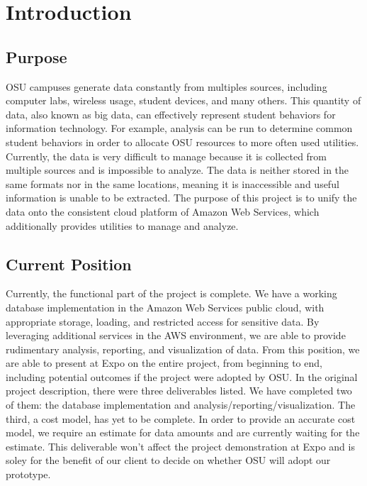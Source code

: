 \section{Introduction}
	\subsection{Purpose}
    OSU campuses generate data constantly from multiples sources, including computer labs, wireless usage, student devices, and many others. This quantity of data, also known as big data, can effectively represent student behaviors for information technology. For example, analysis can be run to determine common student behaviors in order to allocate OSU resources to more often used utilities. Currently, the data is very difficult to manage because it is collected from multiple sources and is impossible to analyze. The data is neither stored in the same formats nor in the same locations, meaning it is inaccessible and useful information is unable to be extracted. The purpose of this project is to unify the data onto the consistent cloud platform of Amazon Web Services, which additionally provides utilities to manage and analyze.
    
    \subsection{Current Position}
    Currently, the functional part of the project is complete. We have a working database implementation in the Amazon Web Services public cloud, with appropriate storage, loading, and restricted access for sensitive data. By leveraging additional services in the AWS environment, we are able to provide rudimentary analysis, reporting, and visualization of data. From this position, we are able to present at Expo on the entire project, from beginning to end, including potential outcomes if the project were adopted by OSU. In the original project description, there were three deliverables listed. We have completed two of them: the database implementation and analysis/reporting/visualization. The third, a cost model, has yet to be complete. In order to provide an accurate cost model, we require an estimate for data amounts and are currently waiting for the estimate. This deliverable won't affect the project demonstration at Expo and is soley for the benefit of our client to decide on whether OSU will adopt our prototype.